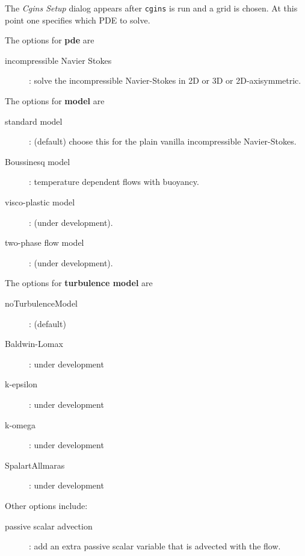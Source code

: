\documentclass{article}
\newcommand{\bogus}[1]{}  %
\begin{document}
The {\em  Cgins Setup} dialog appears after {\tt cgins} is run and a grid is chosen.
At this point one specifies which PDE to solve.

\noindent The options for {\bf pde} are
\begin{description}
  \item[\qquad incompressible Navier Stokes] : solve the incompressible Navier-Stokes in 2D or 3D or
                 2D-axisymmetric.
\end{description}

\noindent The options for {\bf model} are
\begin{description}
  \item[\qquad standard model] : (default) choose this for the plain vanilla incompressible Navier-Stokes. 
  \item[\qquad Boussinesq model] : temperature dependent flows with buoyancy. 
  \item[\qquad visco-plastic model] : (under development). 
  \item[\qquad two-phase flow model] : (under development). 
\end{description}

\noindent The options for {\bf turbulence model} are
\begin{description}
  \item[\qquad noTurbulenceModel] : (default)
  \item[\qquad Baldwin-Lomax] : under development
  \item[\qquad k-epsilon] : under development
  \item[\qquad k-omega] : under development
  \item[\qquad SpalartAllmaras] : under development
\end{description}

\noindent Other options include:
\begin{description}
  \item[\qquad passive scalar advection] : add an extra passive scalar variable that is advected with the flow.
\end{description}




\bogus{
\noindent The {\em } options are
\begin{description}
  \item[\qquad ] : 
\end{description}
}
\end{document}
